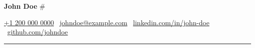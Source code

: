 {\Huge\bfseries John Doe} #

\vspace{2\vspaceDefault}

\href{tel:+12000000000}{+1 200 000 0000} \textbullet\
\href{mailto:johndoe@example.com}{johndoe@example.com} \textbullet\
\href{https://linkedin.com/in/john-doe}{linkedin.com/in/john-doe} \textbullet\
\href{https://github.com/johndoe}{github.com/johndoe}

\vspace{\vspaceDefault}

\hrule
